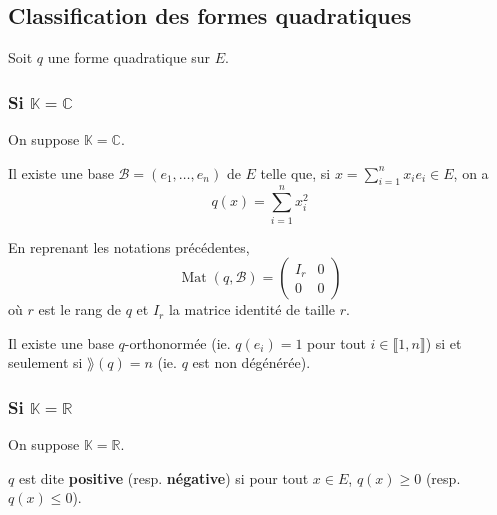 	\subsection{Classification des formes quadratiques}

	Soit $q$ une forme quadratique sur $E$.

	\subsubsection{Si \texorpdfstring{$\mathbb{K} = \mathbb{C}$}{K = C}}

	On suppose $\mathbb{K} = \mathbb{C}$.


	\begin{theorem}
		Il existe une base $\mathcal{B} = (e_1, \dots, e_n)$ de $E$ telle que, si $x = \sum_{i=1}^n x_i e_i \in E$, on a
		\[ q(x) = \sum_{i=1}^n x_i^2 \]
	\end{theorem}

	\begin{remark}
		En reprenant les notations précédentes,
		\[
			\operatorname{Mat}(q, \mathcal{B}) =
			\begin{pmatrix}
				I_r & 0 \\
				0 & 0
			\end{pmatrix}
		\]
		où $r$ est le rang de $q$ et $I_r$ la matrice identité de taille $r$.
	\end{remark}

	\begin{corollary}
		Il existe une base $q$-orthonormée (ie. $q(e_i) = 1$ pour tout $i \in \llbracket 1, n \rrbracket$) si et seulement si $\rang(q) = n$ (ie. $q$ est non dégénérée).
	\end{corollary}

	\subsubsection{Si \texorpdfstring{$\mathbb{K} = \mathbb{R}$}{K = R}}

	On suppose $\mathbb{K} = \mathbb{R}$.


	\begin{definition}
		$q$ est dite \textbf{positive} (resp. \textbf{négative}) si pour tout $x \in E$, $q(x) \geq 0$ (resp. $q(x) \leq 0$).
	\end{definition}


